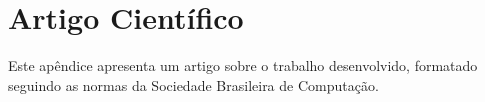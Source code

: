 \chapter{Artigo Científico}

Este apêndice apresenta um artigo sobre o trabalho desenvolvido, formatado seguindo as normas da Sociedade Brasileira de Computação.

